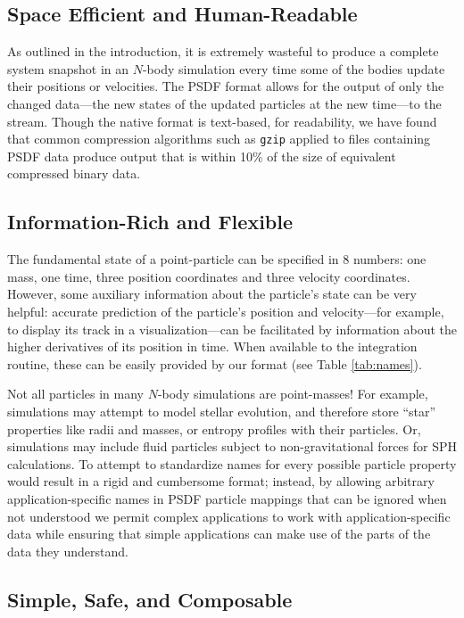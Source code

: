 \documentclass[5p,authoryear]{elsarticle}
\begin{document}
\subsection{Space Efficient and Human-Readable}

As outlined in the introduction, it is extremely wasteful to produce a
complete system snapshot in an $N$-body simulation every time some of
the bodies update their positions or velocities.  The PSDF format
allows for the output of only the changed data---the new states of the
updated particles at the new time---to the stream.  Though the native
format is text-based, for readability, we have found that common
compression algorithms such as {\tt gzip} applied to files containing
PSDF data produce output that is within 10\% of the size of equivalent
compressed binary data.

\subsection{Information-Rich and Flexible}

The fundamental state of a point-particle can be specified in 8
numbers: one mass, one time, three position coordinates and three
velocity coordinates.  However, some auxiliary information about the
particle's state can be very helpful: accurate prediction of the
particle's position and velocity---for example, to display its track
in a visualization---can be facilitated by information about the
higher derivatives of its position in time.  When available to the
integration routine, these can be easily provided by our format (see
Table \ref{tab:names}).  

Not all particles in many $N$-body simulations are point-masses!  For
example, simulations may attempt to model stellar evolution, and
therefore store ``star'' properties like radii and masses, or entropy
profiles with their particles.  Or, simulations may include fluid
particles subject to non-gravitational forces for SPH calculations.
To attempt to standardize names for every possible particle property
would result in a rigid and cumbersome format; instead, by allowing
arbitrary application-specific names in PSDF particle mappings that
can be ignored when not understood we permit complex applications to
work with application-specific data while ensuring that simple
applications can make use of the parts of the data they
understand.

\subsection{Simple, Safe, and Composable}
\end{document}
